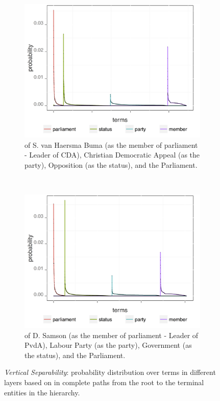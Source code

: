 \begin{figure}[!t]
        \centering
        \begin{subfigure}[b]{0.45\textwidth}
\includegraphics[width=\linewidth]{02-part-01/chapter-03/figs_and_tables/img_nlm02316.png}
\caption{\label{fig:VSO} \achswlm of S. van Haersma Buma (as the member of parliament - Leader of CDA), Christian Democratic Appeal (as the party), Opposition (as the status), and the Parliament.}
        \end{subfigure}
        ~~~~~~~~
        \begin{subfigure}[b]{0.45\textwidth}
\centering
\includegraphics[width=\linewidth]{02-part-01/chapter-03/figs_and_tables/img_nlm02335.png}
\caption{\label{fig:VSC} \achswlm of D. Samson (as the member of parliament - Leader of PvdA), Labour Party (as the party), Government (as the status), and the Parliament.}
        \end{subfigure}
        \caption{\label{fig:VS} \emph{Vertical Separability}: probability distribution over terms in different layers based on \hswlms in complete paths from the root to the terminal entities in the hierarchy.}
\end{figure}

